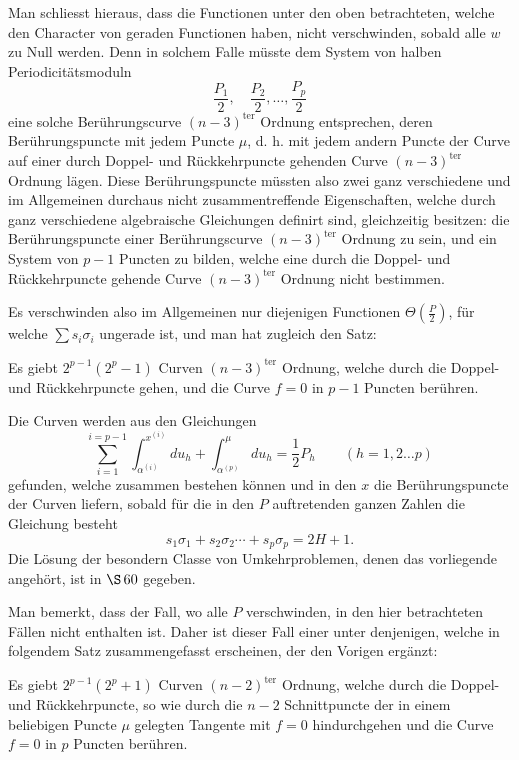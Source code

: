 \documentclass[10pt]{article}
\begin{document}
Man schliesst hieraus, dass die Functionen unter den oben betrachteten, welche den Character von geraden Functionen haben, nicht verschwinden, sobald alle \(w\) zu Null werden. Denn in solchem Falle müsste dem System von halben Periodicitätsmoduln
\[
\frac{P_1}{2},\quad \frac{P_2}{2},\ldots,\frac{P_p}{2}
\]
eine solche Berührungscurve \((n-3)^{\text{ter}}\) Ordnung entsprechen, deren Berührungspuncte mit jedem Puncte \(\mu\), d. h. mit jedem andern Puncte der Curve auf einer durch Doppel- und Rückkehrpuncte gehenden Curve \((n-3)^{\text{ter}}\) Ordnung lägen. Diese Berührungspuncte müssten also zwei ganz verschiedene und im Allgemeinen durchaus nicht zusammentreffende Eigenschaften, welche durch ganz verschiedene algebraische Gleichungen definirt sind, gleichzeitig besitzen: die Berührungspuncte einer Berührungscurve \((n-3)^{\text{ter}}\) Ordnung zu sein, und ein System von \(p-1\) Puncten zu bilden, welche eine durch die Doppel- und Rückkehrpuncte gehende Curve \((n-3)^{\text{ter}}\) Ordnung nicht bestimmen.

Es verschwinden also im Allgemeinen nur diejenigen Functionen \(\Theta\left(\frac P2\right)\), für welche \(\sum s_i\sigma_i\) ungerade ist, und man hat zugleich den Satz:

Es giebt \(2^{p-1}(2^p-1)\) Curven \((n-3)^{\text{ter}}\) Ordnung, welche durch die Doppel- und Rückkehrpuncte gehen, und die Curve \(f=0\) in \(p-1\) Puncten berühren.

Die Curven werden aus den Gleichungen
\[
\sum_{i=1}^{i=p-1}\int_{\alpha^{(i)}}^{x^{(i)}}du_h
+\int_{\alpha^{(p)}}^{\mu}du_h
=\frac12P_h
\qquad (h=1,2\ldots p)
\]
gefunden, welche zusammen bestehen können und in den \(x\) die Berührungspuncte der Curven liefern, sobald für die in den \(P\) auftretenden ganzen Zahlen die Gleichung besteht
\[
s_1\sigma_1+s_2\sigma_2\cdots+s_p\sigma_p=2H+1.
\]
Die Lösung der besondern Classe von Umkehrproblemen, denen das vorliegende angehört, ist in \(\S\,60\) gegeben.

Man bemerkt, dass der Fall, wo alle \(P\) verschwinden, in den hier betrachteten Fällen nicht enthalten ist. Daher ist dieser Fall einer unter denjenigen, welche in folgendem Satz zusammengefasst erscheinen, der den Vorigen ergänzt:

Es giebt \(2^{p-1}(2^p+1)\) Curven \((n-2)^{\text{ter}}\) Ordnung, welche durch die Doppel- und Rückkehrpuncte, so wie durch die \(n-2\) Schnittpuncte der in einem beliebigen Puncte \(\mu\) gelegten Tangente mit \(f=0\) hindurchgehen und die Curve \(f=0\) in \(p\) Puncten berühren.
\end{document}
